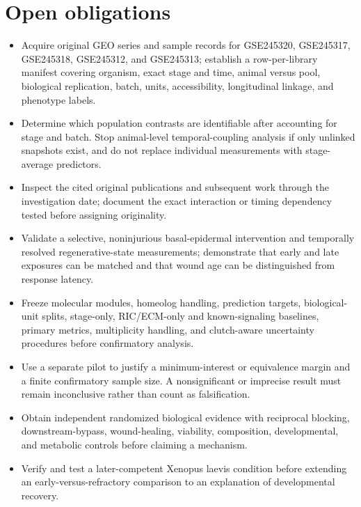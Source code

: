 \documentclass[11pt]{article}
\begin{document}
\section{Open obligations}
\begin{itemize}
\item Acquire original GEO series and sample records for GSE245320, GSE245317, GSE245318, GSE245312, and GSE245313; establish a row-per-library manifest covering organism, exact stage and time, animal versus pool, biological replication, batch, units, accessibility, longitudinal linkage, and phenotype labels.
\item Determine which population contrasts are identifiable after accounting for stage and batch. Stop animal-level temporal-coupling analysis if only unlinked snapshots exist, and do not replace individual measurements with stage-average predictors.
\item Inspect the cited original publications and subsequent work through the investigation date; document the exact interaction or timing dependency tested before assigning originality.
\item Validate a selective, noninjurious basal-epidermal intervention and temporally resolved regenerative-state measurements; demonstrate that early and late exposures can be matched and that wound age can be distinguished from response latency.
\item Freeze molecular modules, homeolog handling, prediction targets, biological-unit splits, stage-only, RIC/ECM-only and known-signaling baselines, primary metrics, multiplicity handling, and clutch-aware uncertainty procedures before confirmatory analysis.
\item Use a separate pilot to justify a minimum-interest or equivalence margin and a finite confirmatory sample size. A nonsignificant or imprecise result must remain inconclusive rather than count as falsification.
\item Obtain independent randomized biological evidence with reciprocal blocking, downstream-bypass, wound-healing, viability, composition, developmental, and metabolic controls before claiming a mechanism.
\item Verify and test a later-competent Xenopus laevis condition before extending an early-versus-refractory comparison to an explanation of developmental recovery.
\end{itemize}
\end{document}
